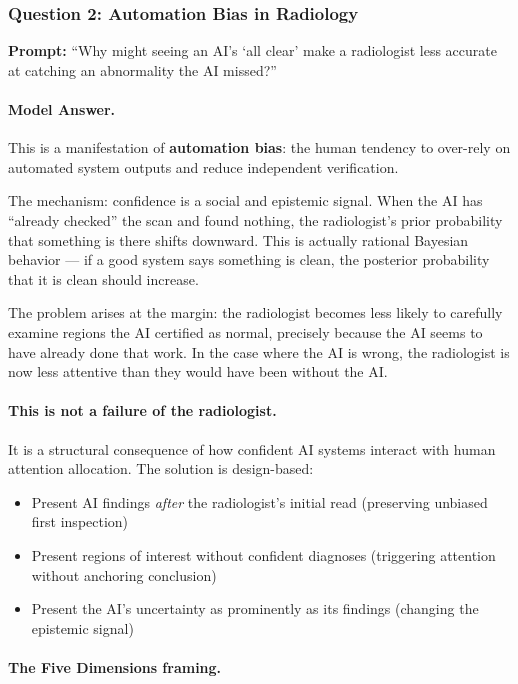 \subsubsection{Question 2: Automation Bias in Radiology}

\textbf{Prompt:} ``Why might seeing an AI's `all clear' make a radiologist less accurate at catching an abnormality the AI missed?''

\paragraph{Model Answer.}

This is a manifestation of \textbf{automation bias}: the human tendency to over-rely on automated system outputs and reduce independent verification.

The mechanism: confidence is a social and epistemic signal. When the AI has ``already checked'' the scan and found nothing, the radiologist's prior probability that something is there shifts downward. This is actually rational Bayesian behavior --- if a good system says something is clean, the posterior probability that it is clean should increase.

The problem arises at the margin: the radiologist becomes less likely to carefully examine regions the AI certified as normal, precisely because the AI seems to have already done that work. In the case where the AI is wrong, the radiologist is now less attentive than they would have been without the AI.

\paragraph{This is not a failure of the radiologist.}

It is a structural consequence of how confident AI systems interact with human attention allocation. The solution is design-based:
\begin{itemize}
    \item Present AI findings \emph{after} the radiologist's initial read (preserving unbiased first inspection)
    \item Present regions of interest without confident diagnoses (triggering attention without anchoring conclusion)
    \item Present the AI's uncertainty as prominently as its findings (changing the epistemic signal)
\end{itemize}

\paragraph{The Five Dimensions framing.}

